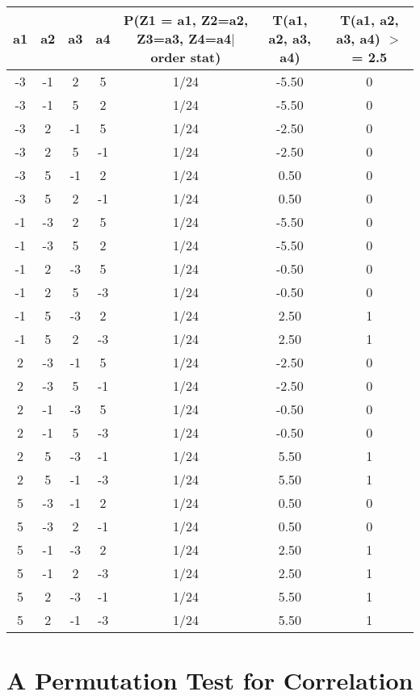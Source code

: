 \documentclass[]{book}
\begin{document}
\begin{table}[ht]
\centering
\begin{tabular}{ccccccc}
  \hline
a1 & a2 & a3 & a4 & P(Z1 = a1, Z2=a2, Z3=a3, Z4=a4$|$order stat) & T(a1, a2, a3, a4) & T(a1, a2, a3, a4) $>$= 2.5 \\ 
  \hline
-3 & -1 & 2 & 5 & 1/24 & -5.50 & 0 \\ 
  -3 & -1 & 5 & 2 & 1/24 & -5.50 & 0 \\ 
  -3 & 2 & -1 & 5 & 1/24 & -2.50 & 0 \\ 
  -3 & 2 & 5 & -1 & 1/24 & -2.50 & 0 \\ 
  -3 & 5 & -1 & 2 & 1/24 & 0.50 & 0 \\ 
  -3 & 5 & 2 & -1 & 1/24 & 0.50 & 0 \\ 
  -1 & -3 & 2 & 5 & 1/24 & -5.50 & 0 \\ 
  -1 & -3 & 5 & 2 & 1/24 & -5.50 & 0 \\ 
  -1 & 2 & -3 & 5 & 1/24 & -0.50 & 0 \\ 
  -1 & 2 & 5 & -3 & 1/24 & -0.50 & 0 \\ 
  -1 & 5 & -3 & 2 & 1/24 & 2.50 & 1 \\ 
  -1 & 5 & 2 & -3 & 1/24 & 2.50 & 1 \\ 
  2 & -3 & -1 & 5 & 1/24 & -2.50 & 0 \\ 
  2 & -3 & 5 & -1 & 1/24 & -2.50 & 0 \\ 
  2 & -1 & -3 & 5 & 1/24 & -0.50 & 0 \\ 
  2 & -1 & 5 & -3 & 1/24 & -0.50 & 0 \\ 
  2 & 5 & -3 & -1 & 1/24 & 5.50 & 1 \\ 
  2 & 5 & -1 & -3 & 1/24 & 5.50 & 1 \\ 
  5 & -3 & -1 & 2 & 1/24 & 0.50 & 0 \\ 
  5 & -3 & 2 & -1 & 1/24 & 0.50 & 0 \\ 
  5 & -1 & -3 & 2 & 1/24 & 2.50 & 1 \\ 
  5 & -1 & 2 & -3 & 1/24 & 2.50 & 1 \\ 
  5 & 2 & -3 & -1 & 1/24 & 5.50 & 1 \\ 
  5 & 2 & -1 & -3 & 1/24 & 5.50 & 1 \\ 
   \hline
\end{tabular}
\end{table}

\hypertarget{a-permutation-test-for-correlation}{%
\section{A Permutation Test for Correlation}\label{a-permutation-test-for-correlation}}
\end{document}
